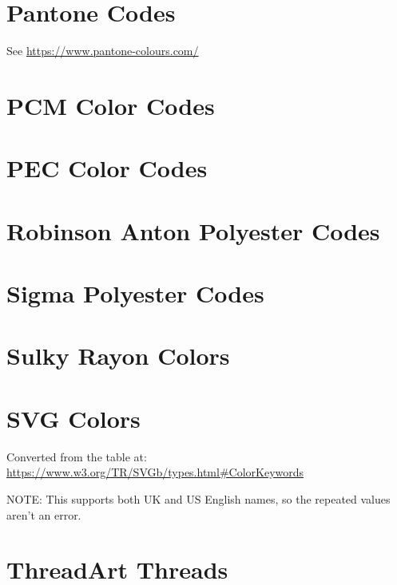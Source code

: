 \documentclass[10pt]{report}
\begin{document}
%

\section{Pantone Codes}

See \url{https://www.pantone-colours.com/}

%

\section{PCM Color Codes}

%

\section{PEC Color Codes}

%

\section{Robinson Anton Polyester Codes}



\section{Sigma Polyester Codes}

%

\section{Sulky Rayon Colors}

%

\section{SVG Colors}

Converted from the table at:
\url{https://www.w3.org/TR/SVGb/types.html#ColorKeywords}

NOTE: This supports both UK and US English names, so the repeated values aren't
an error.

\section{ThreadArt Threads}
\end{document}
